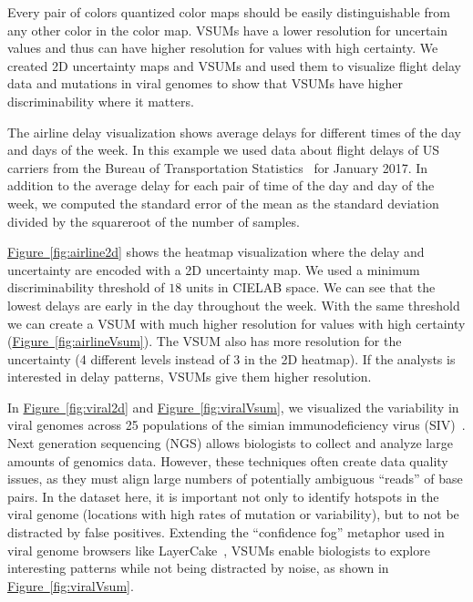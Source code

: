 \documentclass{vgtc}                          %
\newcommand{\figref}[1]{\hyperref[#1]{Figure~\ref*{#1}}}
\begin{document}
Every pair of colors quantized color maps should be easily distinguishable from any other color in the color map. VSUMs have a lower resolution for uncertain values and thus can have higher resolution for values with high certainty. We created 2D uncertainty maps and VSUMs and used them to visualize flight delay data and mutations in viral genomes to show that VSUMs have higher discriminability where it matters.

The airline delay visualization shows average delays for different times of the day and days of the week. In this example we used data about flight delays of US carriers from the Bureau of Transportation Statistics~\cite{bts} for January 2017. In addition to the average delay for each pair of time of the day and day of the week, we computed the standard error of the mean as the standard deviation divided by the squareroot of the number of samples.

\airlineFig

\figref{fig:airline2d} shows the heatmap visualization where the delay and uncertainty are encoded with a 2D uncertainty map. We used a minimum discriminability  threshold of $18$ units in CIELAB space. We can see that the lowest delays are early in the day throughout the week. With the same threshold we can create a VSUM with much higher resolution for values with high certainty (\figref{fig:airlineVsum}). The VSUM also has more resolution for the uncertainty (4 different levels instead of 3 in the 2D heatmap). If the analysts is interested in delay patterns, VSUMs give them higher resolution.

\viralFig

In \figref{fig:viral2d} and \figref{fig:viralVsum}, we visualized the variability in viral genomes across 25 populations of the simian immunodeficiency virus (SIV)~\cite{o2012conditional}. Next generation sequencing (NGS) allows biologists to collect and analyze large amounts of genomics data. However, these techniques often create data quality issues, as they must align large numbers of potentially ambiguous ``reads'' of base pairs. In the dataset here, it is important not only to identify hotspots in the viral genome (locations with high rates of mutation or variability), but to not be distracted by false positives. Extending the ``confidence fog'' metaphor used in viral genome browsers like LayerCake~\cite{correll2015layercake}, VSUMs enable biologists to explore interesting patterns while not being distracted by noise, as shown in \figref{fig:viralVsum}.
\end{document}
